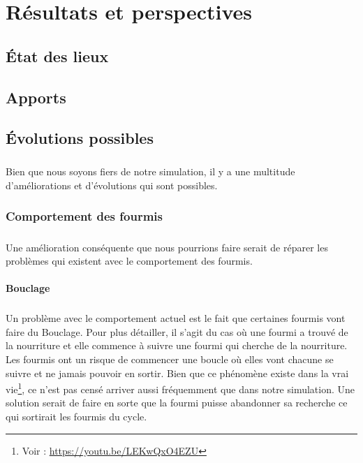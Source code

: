 \documentclass{EPUProjetDi}
\begin{document}
\chapter{Résultats et perspectives}



\section{État des lieux}
\section{Apports}

\section{Évolutions possibles}

\paragraph{}
Bien que nous soyons fiers de notre simulation, il y a une multitude d'améliorations et d'évolutions qui sont possibles.

\subsection{Comportement des fourmis}
\paragraph{}
Une amélioration conséquente que nous pourrions faire serait de réparer les problèmes qui existent avec le comportement des fourmis.

\subsubsection{Bouclage}

\paragraph{}
Un problème avec le comportement actuel est le fait que certaines fourmis vont faire du Bouclage. Pour plus détailler, il s'agit du cas
où une fourmi a trouvé de la nourriture et elle commence à suivre une fourmi qui cherche de la nourriture. 
Les fourmis ont un risque de commencer une boucle où elles vont chacune se suivre et ne jamais pouvoir en sortir.
Bien que ce phénomène existe dans la vrai vie\footnote{Voir : \url{https://youtu.be/LEKwQxO4EZU}}, ce n'est pas censé arriver aussi fréquemment que dans notre simulation.
Une solution serait de faire en sorte que la fourmi puisse abandonner sa recherche ce qui sortirait les fourmis du cycle.
\end{document}
